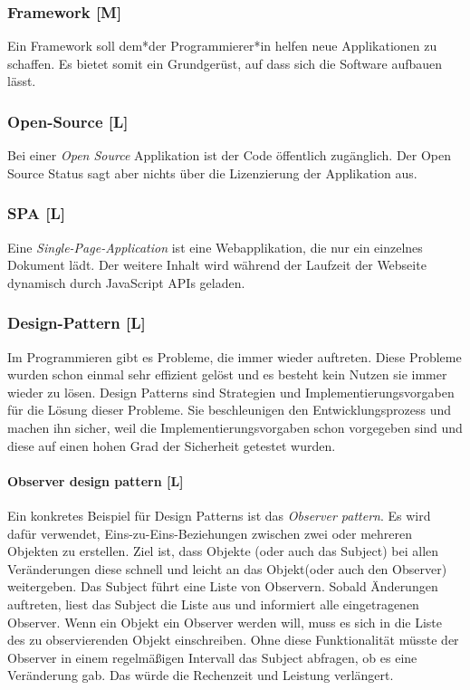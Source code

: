 \subsubsection{Framework [M]}

Ein Framework soll dem*der Programmierer*in helfen neue Applikationen zu schaffen. Es bietet somit ein Grundgerüst, auf dass sich die Software aufbauen lässt.  

\subsubsection{Open-Source [L]}
Bei einer \emph{Open Source} Applikation ist der Code öffentlich zugänglich. Der Open Source Status sagt aber nichts über die Lizenzierung der Applikation aus. \cite{WhatOpenSource}

\subsubsection{SPA [L]}
Eine \emph{Single-Page-Application} ist eine Webapplikation, die nur ein einzelnes Dokument lädt. Der weitere Inhalt wird während der Laufzeit der Webseite dynamisch durch JavaScript APIs geladen. \cite{WhatSPA}


\subsubsection{Design-Pattern [L]}
Im Programmieren gibt es Probleme, die immer wieder auftreten. Diese Probleme wurden schon einmal sehr effizient gelöst und es besteht kein Nutzen sie immer wieder zu lösen. Design Patterns sind Strategien und Implementierungsvorgaben für die Lösung dieser Probleme. Sie beschleunigen den Entwicklungsprozess und machen ihn sicher, weil die Implementierungsvorgaben schon vorgegeben sind und diese auf einen hohen Grad der Sicherheit getestet wurden. \cite{DesignPatterns}

\paragraph{Observer design pattern [L]}
\label{txt:glos:observerDesignPattern}
Ein konkretes Beispiel für Design Patterns ist das \emph{Observer pattern}. Es wird dafür verwendet, Eins-zu-Eins-Beziehungen zwischen zwei oder mehreren Objekten zu erstellen. Ziel ist, dass Objekte (oder auch das Subject) bei allen Veränderungen diese schnell und leicht an das Objekt(oder auch den Observer) weitergeben.  Das Subject führt eine Liste von Observern. Sobald Änderungen auftreten, liest das Subject die Liste aus und informiert alle eingetragenen Observer. Wenn ein Objekt ein Observer werden will, muss es sich in die Liste des zu observierenden Objekt einschreiben. Ohne diese Funktionalität müsste der Observer in einem regelmäßigen Intervall das Subject abfragen, ob es eine Veränderung gab. Das würde die Rechenzeit und Leistung verlängert. \cite{ObserverPatternExplaination}

